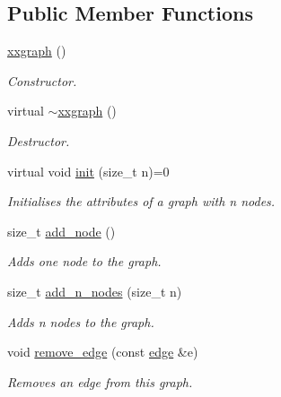 \subsection*{Public Member Functions}
\begin{DoxyCompactItemize}
\item 
\mbox{\label{classlgraph_1_1xxgraph_ab39639da9f99bbf6e4fa382762045419}} 
\hyperlink{classlgraph_1_1xxgraph_ab39639da9f99bbf6e4fa382762045419}{xxgraph} ()
\begin{DoxyCompactList}\small\item\em Constructor. \end{DoxyCompactList}\item 
\mbox{\label{classlgraph_1_1xxgraph_a650130a849fbde867527bbd551b2a48f}} 
virtual \hyperlink{classlgraph_1_1xxgraph_a650130a849fbde867527bbd551b2a48f}{$\sim$xxgraph} ()
\begin{DoxyCompactList}\small\item\em Destructor. \end{DoxyCompactList}\item 
virtual void \hyperlink{classlgraph_1_1xxgraph_aba97900b2d33e1bb0d31594cf169f0ba}{init} (size\+\_\+t n)=0
\begin{DoxyCompactList}\small\item\em Initialises the attributes of a graph with {\itshape n} nodes. \end{DoxyCompactList}\item 
size\+\_\+t \hyperlink{classlgraph_1_1xxgraph_a6cb21d5e52afbb438a3e6643998c40cf}{add\+\_\+node} ()
\begin{DoxyCompactList}\small\item\em Adds one node to the graph. \end{DoxyCompactList}\item 
size\+\_\+t \hyperlink{classlgraph_1_1xxgraph_a8dd24aa48d55dfceaa87e47c32ae914a}{add\+\_\+n\+\_\+nodes} (size\+\_\+t n)
\begin{DoxyCompactList}\small\item\em Adds {\itshape n} nodes to the graph. \end{DoxyCompactList}\item 
void \hyperlink{classlgraph_1_1xxgraph_a46a75fa2a10a8674ab930e9dc766e2f9}{remove\+\_\+edge} (const \hyperlink{namespacelgraph_a76bd7d50719f03de7a85db259d80d572}{edge} \&e)
\begin{DoxyCompactList}\small\item\em Removes an edge from this graph. \end{DoxyCompactList}\item 

\end{DoxyCompactItemize}
